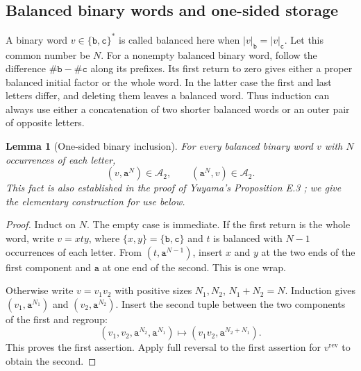 \documentclass[11pt,letterpaper]{article}
\numberwithin{equation}{section}
\newtheorem{lemma}[theorem]{Lemma}
\theoremstyle{definition}
\theoremstyle{remark}
\newcommand{\A}{\mathcal A}
\newcommand{\len}[1]{\lvert #1\rvert}
\renewcommand{\aa}{\mathtt a}
\newcommand{\bb}{\mathtt b}
\newcommand{\cc}{\mathtt c}
\begin{document}
\subsection{Balanced binary words and one-sided storage}
A binary word \(v\in\{\bb,\cc\}^{*}\) is called balanced here when
\(\len{v}_{\bb}=\len{v}_{\cc}\). Let this common number be \(N\).
For a nonempty balanced binary word, follow the difference
\(\#\bb-\#\cc\) along its prefixes. Its first return to zero gives
either a proper balanced initial factor or the whole word. In the latter
case the first and last letters differ, and deleting them leaves a
balanced word. Thus induction can always use either a concatenation of
two shorter balanced words or an outer pair of opposite letters.

\begin{lemma}[One-sided binary inclusion]
\label{lem:onesided}
For every balanced binary word \(v\) with \(N\) occurrences of each
letter,
\[
  (v,\aa^N)\in\A_2,\qquad (\aa^N,v)\in\A_2.
\]
This fact is also established in the proof of Yuyama's Proposition E.3
\cite{Yuyama2026}; we give the elementary construction for use below.
\end{lemma}
\begin{proof}
Induct on \(N\). The empty case is immediate. If the first return is the
whole word, write \(v=xt y\), where \(\{x,y\}=\{\bb,\cc\}\) and
\(t\) is balanced with \(N-1\) occurrences of each letter. From
\((t,\aa^{N-1})\), insert \(x\) and \(y\) at the two ends of the first
component and \(\aa\) at one end of the second. This is one wrap.

Otherwise write \(v=v_1v_2\) with positive sizes \(N_1,N_2\),
\(N_1+N_2=N\). Induction gives
\((v_1,\aa^{N_1})\) and \((v_2,\aa^{N_2})\). Insert the second tuple
between the two components of the first and regroup:
\[
 (v_1,v_2,\aa^{N_2},\aa^{N_1})
   \longmapsto (v_1v_2,\aa^{N_2+N_1}).
\]
This proves the first assertion. Apply full reversal to the first
assertion for \(v^{\mathrm{rev}}\) to obtain the second.
\end{proof}
\end{document}
